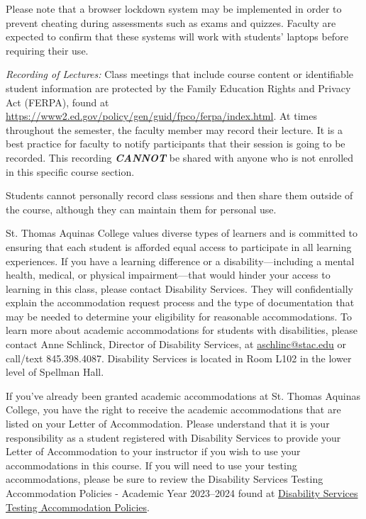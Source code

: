 \documentclass[11pt,letterpaper]{article}
\begin{document}
Please note that a browser lockdown system may be implemented in order to prevent cheating during assessments such as exams and quizzes. Faculty are expected to confirm that these systems will work with students' laptops before requiring their use. \pspace

{\itshape Recording of Lectures:} Class meetings that include course content or identifiable student information are protected by the Family Education Rights and Privacy Act (FERPA), found at \url{https://www2.ed.gov/policy/gen/guid/fpco/ferpa/index.html}. At times throughout the semester, the faculty member may record their lecture. It is a best practice for faculty to notify participants that their session is going to be recorded. This recording \textit{\textbf{CANNOT}} be shared with anyone who is not enrolled in this specific course section. \pspace

Students cannot personally record class sessions and then share them outside of the course, although they can maintain them for personal use. \pspace




St. Thomas Aquinas College values diverse types of learners and is committed to ensuring that each student is afforded equal access to participate in all learning experiences. If you have a learning difference or a disability---including a mental health, medical, or physical impairment---that would hinder your access to learning in this class, please contact Disability Services. They will confidentially explain the accommodation request process and the type of documentation that may be needed to determine your eligibility for reasonable accommodations. To learn more about academic accommodations for students with disabilities, please contact Anne Schlinck, Director of Disability Services, at \href{mailto:aschlinc@stac.edu}{aschlinc@stac.edu} or call/text 845.398.4087. Disability Services is located in Room L102 in the lower level of Spellman Hall. \pspace

If you've already been granted academic accommodations at St. Thomas Aquinas College, you have the right to receive the academic accommodations that are listed on your Letter of Accommodation. Please understand that it is your responsibility as a student registered with Disability Services to provide your Letter of Accommodation to your instructor if you wish to use your accommodations in this course. If you will need to use your testing accommodations, please be sure to review the Disability Services Testing Accommodation Policies - Academic Year 2023--2024 found at \href{https://docs.google.com/document/d/1V5iUtgypiS8kClqhSLPde7AOSZPoLu6CsIDcpiEic2w/edit?usp=sharing}{Disability Services Testing Accommodation Policies}. \sectionbreak
\end{document}
